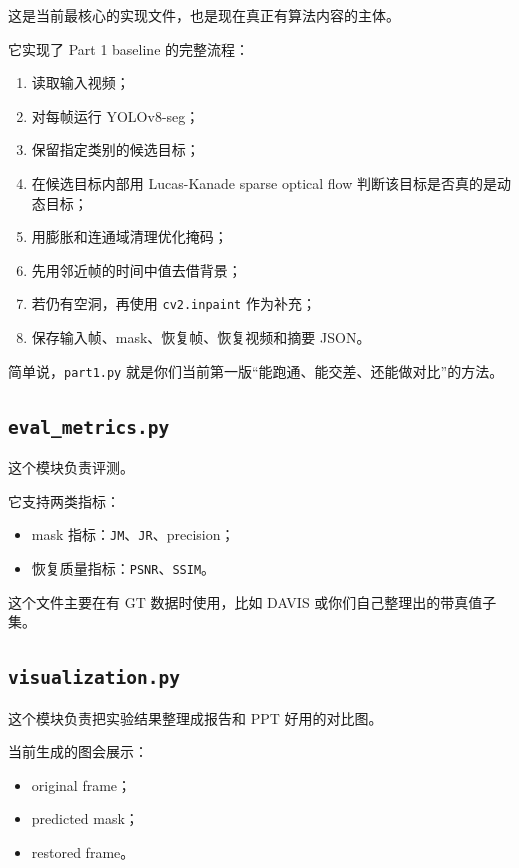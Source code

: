 \documentclass[11pt,a4paper,fontset=none]{ctexart}
\begin{document}
这是当前最核心的实现文件，也是现在真正有算法内容的主体。

它实现了 Part 1 baseline 的完整流程：

\begin{enumerate}
  \item 读取输入视频；
  \item 对每帧运行 YOLOv8-seg；
  \item 保留指定类别的候选目标；
  \item 在候选目标内部用 Lucas-Kanade sparse optical flow 判断该目标是否真的是动态目标；
  \item 用膨胀和连通域清理优化掩码；
  \item 先用邻近帧的时间中值去借背景；
  \item 若仍有空洞，再使用 \texttt{cv2.inpaint} 作为补充；
  \item 保存输入帧、mask、恢复帧、恢复视频和摘要 JSON。
\end{enumerate}

简单说，\texttt{part1.py} 就是你们当前第一版“能跑通、能交差、还能做对比”的方法。

\subsection{\texttt{eval\_metrics.py}}

这个模块负责评测。

它支持两类指标：

\begin{itemize}
  \item mask 指标：\texttt{JM}、\texttt{JR}、precision；
  \item 恢复质量指标：\texttt{PSNR}、\texttt{SSIM}。
\end{itemize}

这个文件主要在有 GT 数据时使用，比如 DAVIS 或你们自己整理出的带真值子集。

\subsection{\texttt{visualization.py}}

这个模块负责把实验结果整理成报告和 PPT 好用的对比图。

当前生成的图会展示：

\begin{itemize}
  \item original frame；
  \item predicted mask；
  \item restored frame。
\end{itemize}
\end{document}
